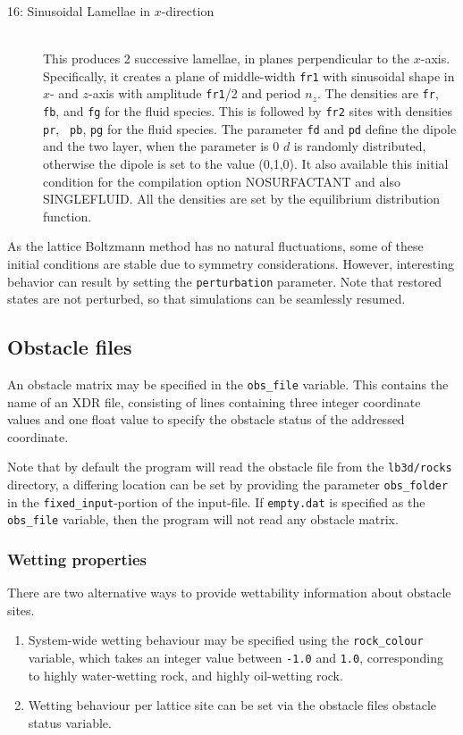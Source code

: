 \documentclass[a4paper]{article}
\begin{document}
\begin{description}

\item[16: Sinusoidal Lamellae in $x$-direction]\ \\
  This produces 2 successive lamellae, in planes perpendicular to the
  $x$-axis. Specifically, it creates a plane of middle-width {\tt fr1} with
  sinusoidal shape in $x$- and $z$-axis with amplitude {\tt fr1}/2 and period
  $n_{z}$. The densities are {\tt fr}, {\tt fb}, and {\tt fg} for the fluid
  species. This is followed by {\tt fr2} sites with densities {\tt pr}, {\tt
    pb}, {\tt pg} for the fluid species. The parameter {\tt fd} and {\tt pd}
  define the dipole and the two layer, when the parameter is 0 $d$ is randomly
  distributed, otherwise the dipole is set to the value (0,1,0). It also
  available this initial condition for the compilation option NOSURFACTANT and
  also SINGLEFLUID. All the densities are set by the equilibrium distribution
  function.

\end{description}

As the lattice Boltzmann method has no natural fluctuations, some of these
initial conditions are stable due to symmetry considerations. However,
interesting behavior can result by setting the {\tt perturbation} parameter.
Note that restored states are not perturbed, so that simulations can be
seamlessly resumed.


\subsection{Obstacle files}

An obstacle matrix may be specified in the {\tt obs\_file} variable.
This contains the name of an XDR file, consisting of lines containing three integer coordinate values and one float value to specify the obstacle status of the addressed coordinate.

Note that by default the program will read the obstacle file
from the {\tt lb3d/rocks} directory, a differing location can be set by providing the parameter {\tt obs\_folder} in the {\tt fixed\_input}-portion of the input-file. If {\tt empty.dat} is specified as the {\tt obs\_file} variable, then the program will not read any obstacle matrix.

\subsubsection{Wetting properties}
There are two alternative ways to provide wettability information about obstacle sites. 
\begin{enumerate}
\item System-wide wetting behaviour may be specified using the {\tt rock\_colour} variable, which takes an integer value between {\tt -1.0} and {\tt 1.0},
corresponding to highly water-wetting rock, and highly oil-wetting rock.
\item Wetting behaviour per lattice site can be set via the obstacle files obstacle status variable.
\end{enumerate}
\end{document}
